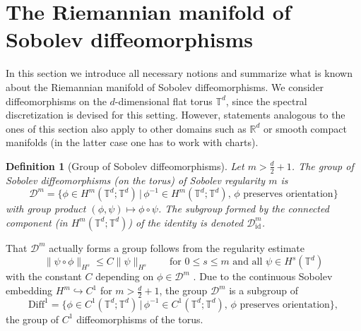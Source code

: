 \documentclass[a4paper, 12pt]{article}
\newtheorem{definition}[theorem]{Definition}
\newcommand{\R}{\mathbb{R}}
\newcommand{\T}{\mathbb{T}}
\newcommand{\id}{\mathrm{id}}
\newcommand{\DiffSob}{\mathcal D}
\newcommand{\DiffSobId}{\mathcal D_{\id}}
\newcommand{\Diff}{\mathrm{Diff}}
\begin{document}
\section{The Riemannian manifold of Sobolev diffeomorphisms}\label{sec:SobolevDiffeomorphisms}
In this section we introduce all necessary notions and summarize what is known about the Riemannian manifold of Sobolev diffeomorphisms.
We consider diffeomorphisms on the $d$-dimensional flat torus $\T^d$, since the spectral discretization is devised for this setting.
However, statements analogous to the ones of this section also apply to other domains such as $\R^d$ or smooth compact manifolds (in the latter case one has to work with charts).

\begin{definition}[Group of Sobolev diffeomorphisms]
Let $m>\frac d2+1$.
The group of \emph{Sobolev diffeomorphisms} (on the torus) of Sobolev regularity $m$ is
\begin{equation*}
\DiffSob^m=\{\phi\in H^m(\T^d;\T^d)\,|\,\phi^{-1}\in H^m(\T^d;\T^d),\,\phi\text{ preserves orientation}\}
\end{equation*}
with group product $(\phi,\psi)\mapsto\phi\circ\psi$.
The subgroup formed by the connected component (in $H^m(\T^d;\T^d)$) of the identity is denoted $\DiffSobId^m$.
\end{definition}

That $\DiffSob^m$ actually forms a group follows from the regularity estimate
\begin{equation}\label{eqn:regularityComposition}
\|\psi\circ\phi\|_{H^s}\leq C\|\psi\|_{H^s}\qquad\text{for }0\leq s\leq m\text{ and all }\psi\in H^s(\T^d)
\end{equation}
with the constant $C$ depending on $\phi\in\DiffSob^m$ \cite[Lemma 2.7]{InKaTo13}.
Due to the continuous Sobolev embedding $H^m\hookrightarrow C^1$ for $m>\frac d2+1$, the group $\DiffSob^m$ is a subgroup of
\begin{equation*}
\Diff^1=\{\phi\in C^1(\T^d;\T^d)\,|\,\phi^{-1}\in C^1(\T^d;\T^d),\,\phi\text{ preserves orientation}\},
\end{equation*}
the group of $C^1$ diffeomorphisms of the torus.
\end{document}
